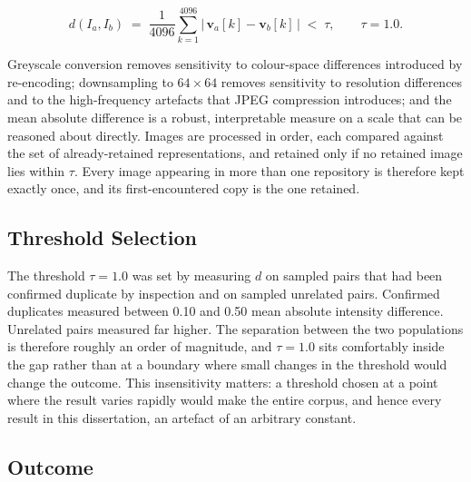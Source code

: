 \documentclass[MScCS]{uccthesis}
\begin{document}
\begin{equation}
   d(I_a, I_b) \;=\; \frac{1}{4096}\sum_{k=1}^{4096}
      \bigl| \, \mathbf{v}_a[k] - \mathbf{v}_b[k] \, \bigr|
   \;<\; \tau,
   \qquad \tau = 1.0 .
   \label{eq:dedup}
\end{equation}

Greyscale conversion removes sensitivity to colour-space differences introduced
by re-encoding; downsampling to $64 \times 64$ removes sensitivity to
resolution differences and to the high-frequency artefacts that JPEG
compression introduces; and the mean absolute difference is a robust,
interpretable measure on a scale that can be reasoned about directly. Images
are processed in order, each compared against the set of already-retained
representations, and retained only if no retained image lies within $\tau$.
Every image appearing in more than one repository is therefore kept exactly
once, and its first-encountered copy is the one retained.

\subsection{Threshold Selection}

The threshold $\tau = 1.0$ was set by measuring $d$ on sampled pairs that had
been confirmed duplicate by inspection and on sampled unrelated pairs.
Confirmed duplicates measured between 0.10 and 0.50 mean absolute intensity
difference. Unrelated pairs measured far higher. The separation between the two
populations is therefore roughly an order of magnitude, and $\tau = 1.0$ sits
comfortably inside the gap rather than at a boundary where small changes in the
threshold would change the outcome. This insensitivity matters: a threshold
chosen at a point where the result varies rapidly would make the entire corpus, and hence every result in this dissertation, an artefact of an arbitrary
constant.

\subsection{Outcome}
\end{document}
